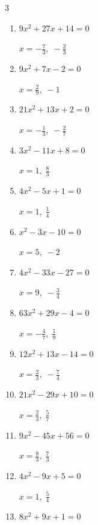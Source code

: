 \begin{multicols}{3}
\begin{enumerate}
        $\displaystyle x=-7,\; 3$

  \item $9x^{2}+27x+14=0$

        $\displaystyle x=-\frac{7}{3},\; -\frac{2}{3}$

  \item $9x^{2}+7x-2=0$

        $\displaystyle x=\frac{2}{9},\; -1$

  \item $21x^{2}+13x+2=0$

        $\displaystyle x=-\frac{1}{3},\; -\frac{2}{7}$

  \item $3x^{2}-11x+8=0$

        $\displaystyle x=1,\; \frac{8}{3}$

  \item $4x^{2}-5x+1=0$

        $\displaystyle x=1,\; \frac{1}{4}$

  \item $x^{2}-3x-10=0$

        $\displaystyle x=5,\; -2$

  \item $4x^{2}-33x-27=0$

        $\displaystyle x=9,\; -\frac{3}{4}$

  \item $63x^{2}+29x-4=0$

        $\displaystyle x=-\frac{4}{7},\; \frac{1}{9}$

\columnbreak %

\resetques

  \item $12x^{2}+13x-14=0$

        $\displaystyle x=\frac{2}{3},\; -\frac{7}{4}$

  \item $21x^{2}-29x+10=0$

        $\displaystyle x=\frac{2}{3},\; \frac{5}{7}$

  \item $9x^{2}-45x+56=0$

        $\displaystyle x=\frac{8}{3},\; \frac{7}{3}$

  \item $4x^{2}-9x+5=0$

        $\displaystyle x=1,\; \frac{5}{4}$

  \item $8x^{2}+9x+1=0$


\end{enumerate}
\end{multicols}
